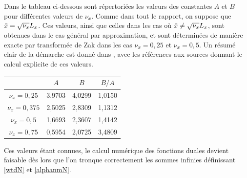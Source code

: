 Dans le tableau ci-dessous sont répertoriées les valeurs des constantes $A$ et $B$ pour différentes valeurs de $\nu_x$.
Comme dans tout le rapport, on suppose que $\bar{x}={\sqrt{\nu_x}}L_x$.
Ces valeurs, ainsi que celles dans les cas où $\bar{x}\neq{\sqrt{\nu_x}}L_x$,
sont obtenues dans le cas général par approximation,
et sont déterminées de manière exacte par transformée de Zak dans les cas $\nu_x=0,25$ et $\nu_x=0,5$.
Un résumé clair de la démarche est donné dans \cite{TheseLugara}, avec les références aux sources donnant le calcul
explicite de ces valeurs.
\begin{center}
   \begin{tabular}{|c|c|c|c|}
     \hline
     \ & $A$ & $B$ & $B/A$\\
     \hline
     $\nu_x=0,25$ & 3,9703 & 4,0299 & 1,0150\\
     \hline
     $\nu_x=0,375$ & 2,5025 & 2,8309 & 1,1312\\
     \hline
     $\nu_x=0,5$ & 1,6693 & 2,3607 & 1,4142\\
     \hline
     $\nu_x=0,75$ & 0,5954 & 2,0725 & 3,4809\\
     \hline
   \end{tabular}
 \end{center}
Ces valeurs étant connues, le calcul numérique des fonctions duales devient faisable dès lors que l'on
tronque correctement les sommes infinies définissant \eqref{wtdN} et \eqref{alphanmN}.

